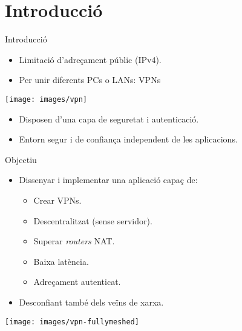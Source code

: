\section{Introducció}
    \begin{frame}{Introducció}
        \begin{itemize}
\item Limitació d'adreçament públic (IPv4).
\item Per unir diferents PCs o LANs: VPNs
        \end{itemize}
        \begin{center}
        \texttt{[image: images/vpn]}
        \end{center}
        \begin{itemize}
\item Disposen d'una capa de seguretat i autenticació.
\item Entorn segur i de confiança independent de les aplicacions.
        \end{itemize}
    \end{frame}
    \begin{frame}{Objectiu}
        \begin{itemize}
\item Dissenyar i implementar una aplicació capaç de:
            \begin{itemize}
\item Crear VPNs.
\item Descentralitzat (sense servidor).
\item Superar \emph{routers} NAT.
\item Baixa latència.
\item Adreçament autenticat.
            \end{itemize}
\item Desconfiant també dels veïns de xarxa.
        \end{itemize}
        \begin{center}
        \texttt{[image: images/vpn-fullymeshed]}
        \end{center}
    \end{frame}
